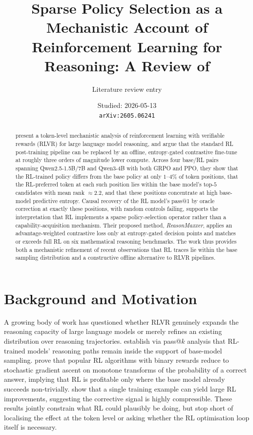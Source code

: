 \documentclass[11pt]{article}
\title{Sparse Policy Selection as a Mechanistic Account of Reinforcement Learning for Reasoning: A Review of \citet{akgul2026}}
\author{Literature review entry}
\date{Studied: 2026-05-13 \\ \texttt{arXiv:2605.06241}}
\begin{document}
\maketitle

\begin{abstract}
\citet{akgul2026} present a token-level mechanistic analysis of reinforcement learning with verifiable rewards (RLVR) for large language model reasoning, and argue that the standard RL post-training pipeline can be replaced by an offline, entropy-gated contrastive fine-tune at roughly three orders of magnitude lower compute. Across four base/RL pairs spanning Qwen2.5-1.5B/7B and Qwen3-4B with both GRPO \citep{shao2024grpo} and PPO, they show that the RL-trained policy differs from the base policy at only $1$--$4\%$ of token positions, that the RL-preferred token at each such position lies within the base model's top-$5$ candidates with mean rank $\approx 2.2$, and that these positions concentrate at high base-model predictive entropy. Causal recovery of the RL model's pass@1 by oracle correction at exactly these positions, with random controls failing, supports the interpretation that RL implements a sparse policy-selection operator rather than a capability-acquisition mechanism. Their proposed method, \emph{ReasonMaxxer}, applies an advantage-weighted contrastive loss only at entropy-gated decision points and matches or exceeds full RL on six mathematical reasoning benchmarks. The work thus provides both a mechanistic refinement of recent observations that RL traces lie within the base sampling distribution \citep{yue2025passatk} and a constructive offline alternative to RLVR pipelines.
\end{abstract}

\section*{Background and Motivation}

A growing body of work has questioned whether RLVR genuinely expands the reasoning capacity of large language models or merely refines an existing distribution over reasoning trajectories. \citet{yue2025passatk} establish via pass@$k$ analysis that RL-trained models' reasoning paths remain inside the support of base-model sampling. \citet{davis2025objective} prove that popular RL algorithms with binary rewards reduce to stochastic gradient ascent on monotone transforms of the probability of a correct answer, implying that RL is profitable only where the base model already succeeds non-trivially. \citet{wang2025oneexample} show that a single training example can yield large RL improvements, suggesting the corrective signal is highly compressible. These results jointly constrain what RL could plausibly be doing, but stop short of localising the effect at the token level or asking whether the RL optimisation loop itself is necessary.
\end{document}
